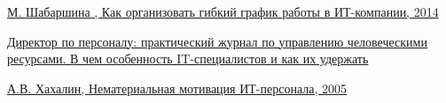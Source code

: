 \documentclass{../industrial-development}
\begin{document}
\begin{thebibliography}{99}
 \href{http://saas.ru/cases/~kak-orghanizovat-ghibkii-ghrafik-raboty-v-it-kompanii}{М. Шабаршина , Как организовать гибкий график работы в ИТ-компании, 2014}

 \href{https://www.hr-director.ru/article/63599-qqe-15-m4-v-kompanii-ploho-prijivayutsya-it-spetsialisty}{Директор по персоналу: практический журнал по управлению человеческими ресурсами. В чем особенность IT-специалистов и как их удержать}


 \href{https://www.ippnou.ru/print/001184/}{А.В. Хахалин, Нематериальная мотивация ИТ-персонала, 2005}




\end{thebibliography}
\end{document}

